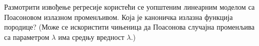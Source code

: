 \item {} Размотрити извођење регресије користећи се уопштеним линеарним моделом са Поасоновом излазном променљивом. Која је каноничка излазна функција породице? (Може се искористити чињеница да Поасонова случајна променљива са параметром $\lambda$ има средњу вредност $\lambda$.)
